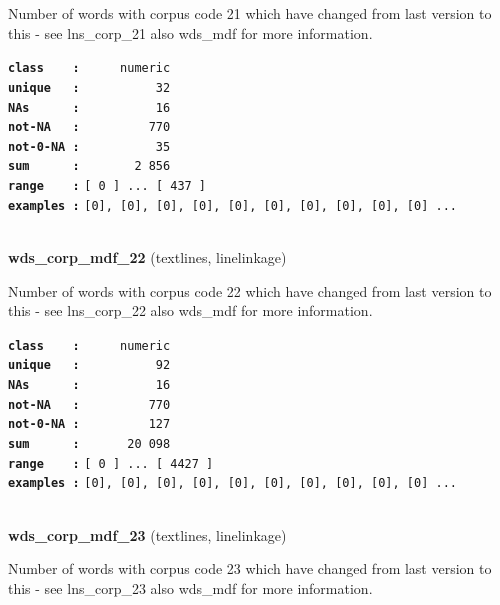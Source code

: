 \documentclass[]{article}
\begin{document}
Number of words with corpus code 21 which have changed from last version
to this - see lns\_corp\_21 also wds\_mdf for more information.

\textbf{\texttt{class\ \ \ \ :}} \texttt{~~~~~numeric}\\
\textbf{\texttt{unique\ \ \ :}} \texttt{~~~~~~~~~~32}\\
\textbf{\texttt{NAs\ \ \ \ \ \ :}} \texttt{~~~~~~~~~~16}\\
\textbf{\texttt{not-NA\ \ \ :}} \texttt{~~~~~~~~~770}\\
\textbf{\texttt{not-0-NA\ :}} \texttt{~~~~~~~~~~35}\\
\textbf{\texttt{sum\ \ \ \ \ \ :}} \texttt{~~~~~~~2~856}\\
\textbf{\texttt{range\ \ \ \ :}}
\texttt{{[}\ 0\ {]}\ ...\ {[}\ 437\ {]}}\\
\textbf{\texttt{examples\ :}}
\texttt{{[}0{]},\ {[}0{]},\ {[}0{]},\ {[}0{]},\ {[}0{]},\ {[}0{]},\ {[}0{]},\ {[}0{]},\ {[}0{]},\ {[}0{]}\ ...}\\

~

\textbf{wds\_corp\_mdf\_22} (textlines, linelinkage)

Number of words with corpus code 22 which have changed from last version
to this - see lns\_corp\_22 also wds\_mdf for more information.

\textbf{\texttt{class\ \ \ \ :}} \texttt{~~~~~numeric}\\
\textbf{\texttt{unique\ \ \ :}} \texttt{~~~~~~~~~~92}\\
\textbf{\texttt{NAs\ \ \ \ \ \ :}} \texttt{~~~~~~~~~~16}\\
\textbf{\texttt{not-NA\ \ \ :}} \texttt{~~~~~~~~~770}\\
\textbf{\texttt{not-0-NA\ :}} \texttt{~~~~~~~~~127}\\
\textbf{\texttt{sum\ \ \ \ \ \ :}} \texttt{~~~~~~20~098}\\
\textbf{\texttt{range\ \ \ \ :}}
\texttt{{[}\ 0\ {]}\ ...\ {[}\ 4427\ {]}}\\
\textbf{\texttt{examples\ :}}
\texttt{{[}0{]},\ {[}0{]},\ {[}0{]},\ {[}0{]},\ {[}0{]},\ {[}0{]},\ {[}0{]},\ {[}0{]},\ {[}0{]},\ {[}0{]}\ ...}\\

~

\textbf{wds\_corp\_mdf\_23} (textlines, linelinkage)

Number of words with corpus code 23 which have changed from last version
to this - see lns\_corp\_23 also wds\_mdf for more information.
\end{document}
